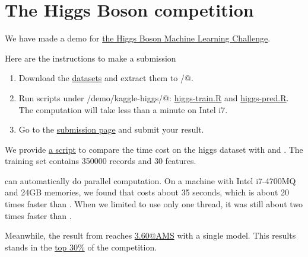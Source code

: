\documentclass{article}\usepackage[]{graphicx}\usepackage[]{color}
\begin{document}
\section{The Higgs Boson competition}

We have made a demo for \href{http://www.kaggle.com/c/higgs-boson}{the Higgs 
Boson Machine Learning Challenge}. 

Here are the instructions to make a submission
\begin{enumerate}
    \item Download the \href{http://www.kaggle.com/c/higgs-boson/data}{datasets}
    and extract them to \verb@data/@.
    \item Run scripts under \verb@xgboost/demo/kaggle-higgs/@: 
    \href{https://github.com/tqchen/xgboost/blob/master/demo/kaggle-higgs/higgs-train.R}{higgs-train.R} 
    and \href{https://github.com/tqchen/xgboost/blob/master/demo/kaggle-higgs/higgs-pred.R}{higgs-pred.R}. 
    The computation will take less than a minute on Intel i7. 
    \item Go to the \href{http://www.kaggle.com/c/higgs-boson/submissions/attach}{submission page} 
    and submit your result.
\end{enumerate}

We provide \href{https://github.com/tqchen/xgboost/blob/master/demo/kaggle-higgs/speedtest.R}{a script}
to compare the time cost on the higgs dataset with \verb@gbm@ and \verb@xgboost@. 
The training set contains 350000 records and 30 features. 

\verb@xgboost@ can automatically do parallel computation. On a machine with Intel
i7-4700MQ and 24GB memories, we found that \verb@xgboost@ costs about 35 seconds, which is about 20 times faster
than \verb@gbm@. When we limited \verb@xgboost@ to use only one thread, it was 
still about two times faster than \verb@gbm@. 

Meanwhile, the result from \verb@xgboost@ reaches 
\href{http://www.kaggle.com/c/higgs-boson/details/evaluation}{3.60@AMS} with a 
single model. This results stands in the 
\href{http://www.kaggle.com/c/higgs-boson/leaderboard}{top 30\%} of the 
competition. 


\nocite{*} %

\end{document}
